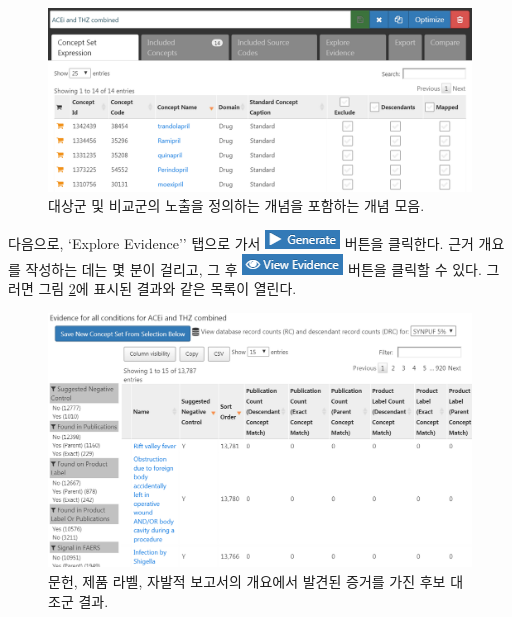 \documentclass[10.5pt]{book}
\theoremstyle{definition}
\theoremstyle{definition}
\theoremstyle{definition}
\theoremstyle{remark}
\begin{document}
\begin{figure}

{\centering \includegraphics[width=1\linewidth]{images/MethodValidity/exposuresConceptSet} 

}

\caption{대상군 및 비교군의 노출을 정의하는 개념을 포함하는 개념 모음.}\label{fig:exposuresConceptSet}
\end{figure}

다음으로, `Explore Evidence'' 탭으로 가서
\includegraphics{images/MethodValidity/generate.png} 버튼을 클릭한다.
근거 개요를 작성하는 데는 몇 분이 걸리고, 그 후
\includegraphics{images/MethodValidity/viewEvidence.png} 버튼을 클릭할
수 있다. 그러면 그림 \ref{fig:candidateNcs}에 표시된 결과와 같은 목록이
열린다.

\begin{figure}

{\centering \includegraphics[width=1\linewidth]{images/MethodValidity/candidateNcs} 

}

\caption{문헌, 제품 라벨, 자발적 보고서의 개요에서 발견된 증거를 가진 후보 대조군 결과.}\label{fig:candidateNcs}
\end{figure}
\end{document}
